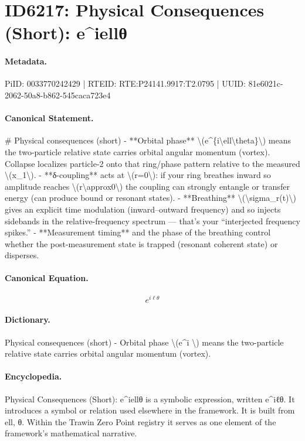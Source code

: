 \section*{ID6217: Physical Consequences (Short): e\textasciicircum{}iellθ}
\paragraph{Metadata.}
PiID: 0033770242429 | RTEID: RTE:P24141.9917:T2.0795 | UUID: 81e6021c-2062-50a8-b862-545caca723e4

\paragraph{Canonical Statement.}
\# Physical consequences (short) - **Orbital phase** \textbackslash{}(e\textasciicircum{}\{i\textbackslash{}ell\textbackslash{}theta\}\textbackslash{}) means the two-particle relative state carries orbital angular momentum (vortex). Collapse localizes particle-2 onto that ring/phase pattern relative to the measured \textbackslash{}(x\_1\textbackslash{}). - **δ-coupling** acts at \textbackslash{}(r=0\textbackslash{}): if your ring breathes inward so amplitude reaches \textbackslash{}(r\textbackslash{}approx0\textbackslash{}) the coupling can strongly entangle or transfer energy (can produce bound or resonant states). - **Breathing** \textbackslash{}(\textbackslash{}sigma\_r(t)\textbackslash{}) gives an explicit time modulation (inward–outward frequency) and so injects sidebands in the relative-frequency spectrum — that’s your “interjected frequency spikes.” - **Measurement timing** and the phase of the breathing control whether the post-measurement state is trapped (resonant coherent state) or disperses.

\paragraph{Canonical Equation.}
\[
e^{i\ell\theta}
\]

\paragraph{Dictionary.}
Physical consequences (short) - Orbital phase \textbackslash{}(e\textasciicircum{}i \textbackslash{}) means the two-particle relative state carries orbital angular momentum (vortex).

\paragraph{Encyclopedia.}
Physical Consequences (Short): e\textasciicircum{}iellθ is a symbolic expression, written e\textasciicircum{}iℓθ. It introduces a symbol or relation used elsewhere in the framework. It is built from ell, θ. Within the Trawin Zero Point registry it serves as one element of the framework's mathematical narrative.
